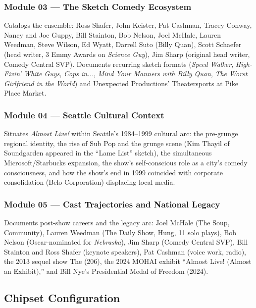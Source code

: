 \documentclass[11pt,letterpaper]{article}
\begin{document}
\subsubsection{Module 03 --- The Sketch Comedy Ecosystem}
Catalogs the ensemble: Ross Shafer, John Keister, Pat Cashman, Tracey Conway, Nancy and Joe Guppy, Bill Stainton, Bob Nelson, Joel McHale, Lauren Weedman, Steve Wilson, Ed Wyatt, Darrell Suto (Billy Quan), Scott Schaefer (head writer, 3 Emmy Awards on \textit{Science Guy}), Jim Sharp (original head writer, Comedy Central SVP). Documents recurring sketch formats (\textit{Speed Walker}, \textit{High-Fivin' White Guys}, \textit{Cops in...}, \textit{Mind Your Manners with Billy Quan}, \textit{The Worst Girlfriend in the World}) and Unexpected Productions' Theatersports at Pike Place Market.

\subsubsection{Module 04 --- Seattle Cultural Context}
Situates \textit{Almost Live!} within Seattle's 1984--1999 cultural arc: the pre-grunge regional identity, the rise of Sub Pop and the grunge scene (Kim Thayil of Soundgarden appeared in the ``Lame List'' sketch), the simultaneous Microsoft/Starbucks expansion, the show's self-conscious role as a city's comedy consciousness, and how the show's end in 1999 coincided with corporate consolidation (Belo Corporation) displacing local media.

\subsubsection{Module 05 --- Cast Trajectories and National Legacy}
Documents post-show careers and the legacy arc: Joel McHale (The Soup, Community), Lauren Weedman (The Daily Show, Hung, 11 solo plays), Bob Nelson (Oscar-nominated for \textit{Nebraska}), Jim Sharp (Comedy Central SVP), Bill Stainton and Ross Shafer (keynote speakers), Pat Cashman (voice work, radio), the 2013 sequel show The (206), the 2024 MOHAI exhibit ``Almost Live! (Almost an Exhibit),'' and Bill Nye's Presidential Medal of Freedom (2024).

\subsection{Chipset Configuration}
\end{document}
